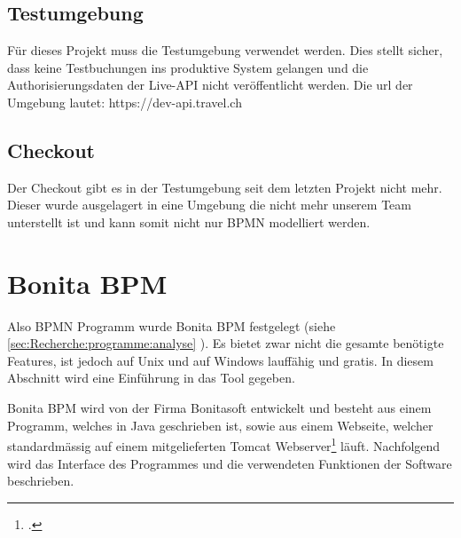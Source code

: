 \subsection{Testumgebung}
Für dieses Projekt muss die Testumgebung verwendet werden. Dies stellt sicher, dass keine Testbuchungen ins produktive System gelangen und die Authorisierungsdaten der Live-API nicht veröffentlicht werden.
Die \gls{url} der Umgebung lautet: https://dev-api.travel.ch

\subsection{Checkout}
Der Checkout gibt es in der Testumgebung seit dem letzten Projekt nicht mehr. Dieser wurde ausgelagert in eine Umgebung die nicht mehr unserem Team unterstellt ist und kann somit nicht nur BPMN modelliert werden.

\section{Bonita BPM}
Also BPMN Programm wurde Bonita BPM festgelegt (siehe \cref{sec:Recherche:programme:analyse} ). Es bietet zwar nicht die gesamte benötigte Features, ist jedoch auf Unix und auf Windows lauffähig und gratis. In diesem Abschnitt wird eine Einführung in das Tool gegeben. 

Bonita BPM wird von der Firma Bonitasoft entwickelt und besteht aus einem Programm, welches in Java geschrieben ist, sowie aus einem Webseite, welcher standardmässig auf einem mitgelieferten Tomcat Webserver\footcite{Tomcat_2016-06-12} läuft.
Nachfolgend wird das Interface des Programmes und die verwendeten Funktionen der Software beschrieben.

